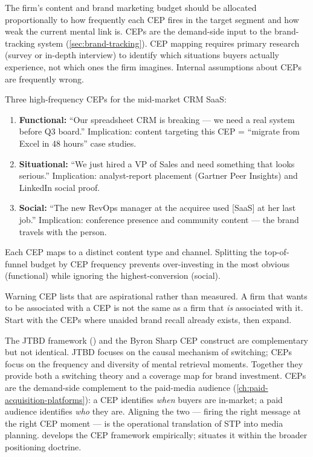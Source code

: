 The firm's content and brand marketing budget should be allocated proportionally to how frequently each CEP fires in the target segment and how weak the current mental link is. CEPs are the demand-side input to the brand-tracking system (\cref{sec:brand-tracking}). CEP mapping requires primary research (survey or in-depth interview) to identify which situations buyers actually experience, not which ones the firm imagines. Internal assumptions about CEPs are frequently wrong.

\begin{example}
Three high-frequency CEPs for the mid-market CRM SaaS:
\begin{enumerate}
  \item \textbf{Functional:} ``Our spreadsheet CRM is breaking --- we need a real system before Q3 board.'' Implication: content targeting this CEP = ``migrate from Excel in 48 hours'' case studies.
  \item \textbf{Situational:} ``We just hired a VP of Sales and need something that looks serious.'' Implication: analyst-report placement (Gartner Peer Insights) and LinkedIn social proof.
  \item \textbf{Social:} ``The new RevOps manager at the acquiree used [SaaS] at her last job.'' Implication: conference presence and community content --- the brand travels with the person.
\end{enumerate}
Each CEP maps to a distinct content type and channel. Splitting the top-of-funnel budget by CEP frequency prevents over-investing in the most obvious (functional) while ignoring the highest-conversion (social).
\end{example}

\begin{admonition}{Warning}
CEP lists that are aspirational rather than measured. A firm that wants to be associated with a CEP is not the same as a firm that \emph{is} associated with it. Start with the CEPs where unaided brand recall already exists, then expand.
\end{admonition}

The JTBD framework (\textcite{christensen1997}) and the Byron Sharp CEP construct are complementary but not identical. JTBD focuses on the causal mechanism of switching; CEPs focus on the frequency and diversity of mental retrieval moments. Together they provide both a switching theory and a coverage map for brand investment. CEPs are the demand-side complement to the paid-media audience (\cref{ch:paid-acquisition-platforms}): a CEP identifies \emph{when} buyers are in-market; a paid audience identifies \emph{who} they are. Aligning the two --- firing the right message at the right CEP moment --- is the operational translation of STP into media planning. \textcite{sharp2010} develops the CEP framework empirically; \textcite{kotler2021} situates it within the broader positioning doctrine.
